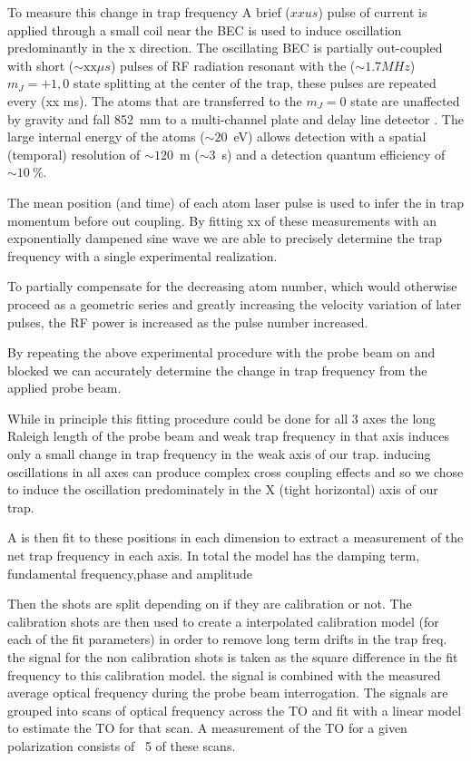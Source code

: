 \documentclass[aps,prl,
,reprint,
superscriptaddress,
onecolumn,
showpacs,preprintnumbers,
 amsmath,amssymb,
]{revtex4-1}
\begin{document}
To measure this change in trap frequency A brief ($xxus$) pulse of current is applied through a small coil near the BEC is used to induce oscillation predominantly in the x direction. The oscillating BEC is partially out-coupled with short ($\sim\text{xx}\mu s$) pulses of RF radiation resonant with the ($\sim 1.7MHz$) $m_J=+1,0$ state splitting at the center of the trap, these pulses are repeated every (xx ms). The atoms that are transferred to the $m_J=0$ state are unaffected by gravity and fall 852~mm to a multi-channel plate and delay line detector \cite{Manning:10}. The large internal energy of the atoms ($\sim 20$~eV) allows detection with a spatial (temporal) resolution of  $\sim 120$~\textmu{}m ($\sim 3$~\textmu{}s) \cite{PhysRevA.97.063601} and a detection quantum efficiency of ${\sim} 10~\%$.  

The mean position (and time) of each atom laser pulse is used to infer the in trap momentum before out coupling. By fitting xx of these measurements with an exponentially dampened sine wave we are able to precisely determine the trap frequency with a single experimental realization.

To partially compensate for the decreasing atom number, which would otherwise proceed as a geometric series and greatly increasing the velocity variation of later pulses, the RF power is increased as the pulse number increased.

By repeating the above experimental procedure with the probe beam on and blocked we can accurately determine the change in trap frequency from the applied probe beam. 

While in principle this fitting procedure could be done for all 3 axes the long Raleigh length of the probe beam and weak trap frequency in that axis  induces only a small change in trap frequency in the weak axis of our trap.  inducing oscillations in all axes can produce complex cross coupling effects and so we chose to induce the oscillation predominately in the X (tight horizontal) axis of our trap.


A is then fit to these positions in each dimension to extract a measurement of the net trap frequency in each axis. 
In total the model has the damping term, fundamental frequency,phase and amplitude
  
Then the shots are split depending on if they are calibration or not.  
The calibration shots are then used to create a interpolated calibration model (for each of the fit parameters) in order to remove long term drifts in the trap freq.
the signal for the non calibration shots is taken as the square difference in the fit frequency to this calibration model.
the signal is combined with the measured average optical frequency during the probe beam interrogation.
The signals are grouped into scans of optical frequency across the TO and fit with a linear model to estimate the TO for that scan.
A measurement of the TO for a given polarization consists of ~5 of these scans.
\end{document}
